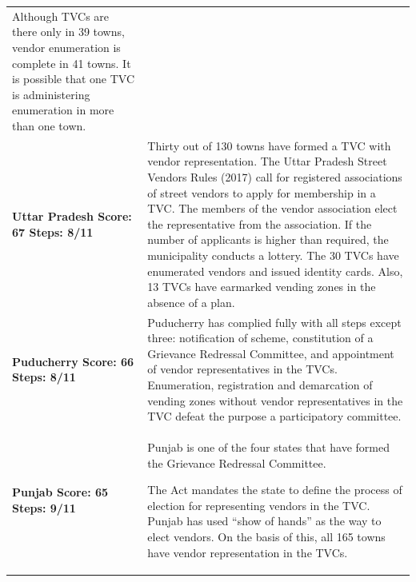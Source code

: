 \documentclass[a4paper, 12pt, twoside]{article}
\begin{document}
{\begin{longtable}[l]{>{\raggedright}p{4cm}>{\raggedright\arraybackslash}p{10cm}}
Although TVCs are there only in 39 towns, vendor enumeration is complete in 41 towns. It is possible that one TVC is administering enumeration in more than one town.
\\
\cellcolor{SVACgreen3}\bf{Uttar Pradesh}
\newline
\bf{Score: 67}
\newline
\bf{Steps: 8/11}
&
\cellcolor{SVACgreen2}Thirty out of 130 towns have formed a TVC with vendor representation. The Uttar Pradesh Street Vendors Rules (2017) call for registered associations of street vendors to apply for membership in a TVC. The members of the vendor association elect the representative from the association. If the number of applicants is higher than required, the municipality conducts a lottery. The 30 TVCs have enumerated vendors and issued identity cards. Also, 13 TVCs have earmarked vending zones in the absence of a plan.
\\
\cellcolor{SVACgreen3}\bf{Puducherry}
\newline
\bf{Score: 66}
\newline
\bf{Steps: 8/11}
&
\cellcolor{SVACgreen2}Puducherry has complied fully with all steps except three: notification of scheme, constitution of a Grievance Redressal Committee, and appointment of vendor representatives in the TVCs. Enumeration, registration and demarcation of vending zones without vendor representatives in the TVC defeat the purpose a participatory committee.
\\
\cellcolor{SVACgreen3}\bf{Punjab}
\newline
\bf{Score: 65}
\newline
\bf{Steps: 9/11}
&
\cellcolor{SVACgreen2}Punjab is one of the four states that have formed the Grievance Redressal Committee.

The Act mandates the state to define the process of election for representing vendors in the TVC. Punjab has used “show of hands” as the way to elect vendors. On the basis of  this, all 165 towns have vendor representation in the TVCs.



\end{longtable}}
\end{document}
